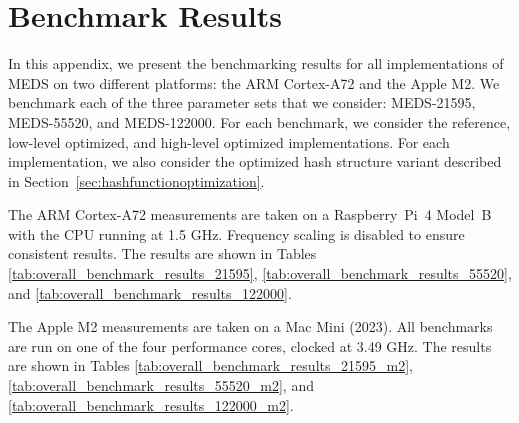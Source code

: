 \chapter{Benchmark Results}
\label{app:benchmark_results}
In this appendix, we present the benchmarking results for all implementations of MEDS on two different platforms: the ARM Cortex-A72 and the Apple M2. We benchmark each of the three parameter sets that we consider: MEDS-21595, MEDS-55520, and MEDS-122000. For each benchmark, we consider the reference, low-level optimized, and high-level optimized implementations. For each implementation, we also consider the optimized hash structure variant described in Section~\ref{sec:hashfunctionoptimization}.

The ARM Cortex-A72 measurements are taken on a Raspberry~Pi~4 Model~B with the CPU running at 1.5 GHz. Frequency scaling is disabled to ensure consistent results. The results are shown in Tables \ref{tab:overall_benchmark_results_21595}, \ref{tab:overall_benchmark_results_55520}, and \ref{tab:overall_benchmark_results_122000}.

The Apple M2 measurements are taken on a Mac Mini (2023). All benchmarks are run on one of the four performance cores, clocked at 3.49 GHz. The results are shown in Tables \ref{tab:overall_benchmark_results_21595_m2}, \ref{tab:overall_benchmark_results_55520_m2}, and \ref{tab:overall_benchmark_results_122000_m2}.

\pagebreak

